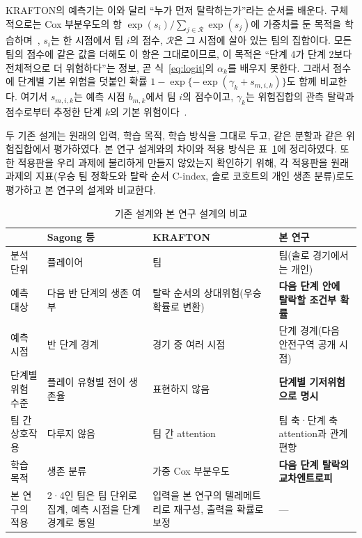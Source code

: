 KRAFTON의 예측기는 이와 달리 “누가 먼저 탈락하는가”라는 순서를 배운다.
구체적으로는 Cox 부분우도의 항 $\exp(s_i)/\sum_{j\in\mathcal{R}}\exp(s_j)$에 가중치를 둔 목적을 학습하며~\cite{Cox72}, $s_i$는 한 시점에서 팀 $i$의 점수, $\mathcal{R}$은 그 시점에 살아 있는 팀의 집합이다.
모든 팀의 점수에 같은 값을 더해도 이 항은 그대로이므로, 이 목적은 “단계 4가 단계 2보다 전체적으로 더 위험하다”는 정보, 곧 식~\eqref{eq:logit}의 $\alpha_k$를 배우지 못한다.
그래서 점수에 단계별 기본 위험을 덧붙인 확률 $1-\exp\{-\exp(\gamma_k+s_{m,i,k})\}$도 함께 비교한다. 여기서 $s_{m,i,k}$는 예측 시점 $b_{m,k}$에서 팀 $i$의 점수이고, $\gamma_k$는 위험집합의 관측 탈락과 점수로부터 추정한 단계 $k$의 기본 위험이다~\cite{PrenticeGloeckler78}.

두 기존 설계는 원래의 입력, 학습 목적, 학습 방식을 그대로 두고, 같은 분할과 같은 위험집합에서 평가하였다. 본 연구 설계와의 차이와 적용 방식은 표~\ref{tab:compare}에 정리하였다.
또한 적용판을 우리 과제에 불리하게 만들지 않았는지 확인하기 위해, 각 적용판을 원래 과제의 지표(우승 팀 정확도와 탈락 순서 C-index, 솔로 코호트의 개인 생존 분류)로도 평가하고 본 연구의 설계와 비교한다.

\begin{table}[t]
\centering
\caption{기존 설계와 본 연구 설계의 비교}
\label{tab:compare}
\footnotesize
\renewcommand{\arraystretch}{1.1}
\begin{tabular}{p{2.3cm}p{4.3cm}p{4.6cm}p{4.6cm}}
\hline
 & Sagong 등~\cite{Sagong25a} & KRAFTON~\cite{KRAFTON} & 본 연구 \\
\hline
분석 단위 & 플레이어 & 팀 & 팀(솔로 경기에서는 개인) \\
예측 대상 & 다음 반 단계의 생존 여부 & 탈락 순서의 상대위험(우승확률로 변환) & \textbf{다음 단계 안에 탈락할 조건부 확률} \\
예측 시점 & 반 단계 경계 & 경기 중 여러 시점 & 단계 경계(다음 안전구역 공개 시점) \\
단계별 위험 수준 & 플레이 유형별 전이 생존율 & 표현하지 않음 & \textbf{단계별 기저위험으로 명시} \\
팀 간 상호작용 & 다루지 않음 & 팀 간 attention & 팀 축·단계 축 attention과 관계 편향 \\
학습 목적 & 생존 분류 & 가중 Cox 부분우도 & \textbf{다음 단계 탈락의 교차엔트로피} \\
\hline
본 연구의 적용 & 2·4인 팀은 팀 단위로 집계, 예측 시점을 단계 경계로 통일 & 입력을 본 연구의 텔레메트리로 재구성, 출력을 확률로 보정 & --- \\
\hline
\end{tabular}
\end{table}

